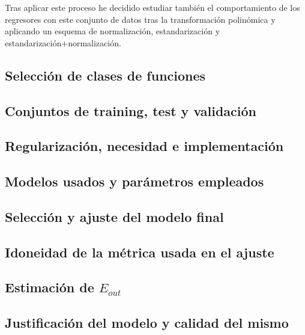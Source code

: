 \documentclass[12pt,a4paper]{article}
\begin{document}
Tras aplicar este proceso he decidido estudiar también el comportamiento de los regresores con este conjunto de datos tras la transformación polinómica y aplicando un esquema de normalización, estandarización y estandarización+normalización.

\subsection{Selección de clases de funciones}

\subsection{Conjuntos de training, test y validación}

\subsection{Regularización, necesidad e implementación}

\subsection{Modelos usados y parámetros empleados}

\subsection{Selección y ajuste del modelo final}

\subsection{Idoneidad de la métrica usada en el ajuste}

\subsection{Estimación de $E_{out}$}

\subsection{Justificación del modelo y calidad del mismo}
\end{document}
